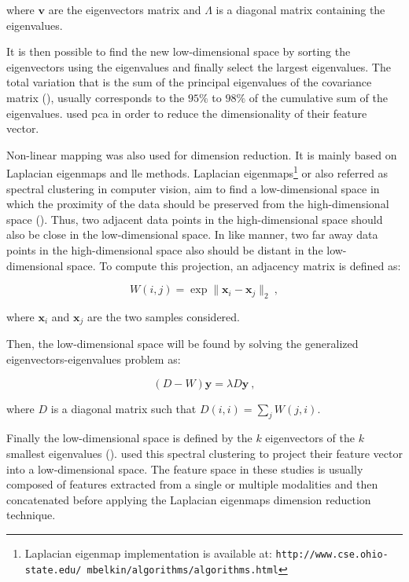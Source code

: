\noindent where $\mathbf{v}$ are the eigenvectors matrix and $\Lambda$ is a diagonal matrix containing the eigenvalues. 

It is then possible to find the new low-dimensional space by sorting the eigenvectors using the eigenvalues and finally select the largest eigenvalues. The total variation that is the sum of the principal eigenvalues of the covariance matrix (\cite{Fodor2002}), usually corresponds to the $95\%$ to $98\%$ of the cumulative sum of the eigenvalues. \cite{Tiwari2008,Tiwari2009,Tiwari2012} used \ac{pca} in order to reduce the dimensionality of their feature vector.

Non-linear mapping was also used for dimension reduction. It is mainly based on Laplacian eigenmaps and \acf{lle} methods. Laplacian eigenmaps\footnote{Laplacian eigenmap implementation is available at: \texttt{http://www.cse.\allowbreak ohio-state.edu/~mbelkin/algorithms/algorithms.html}} or also referred as spectral clustering in computer vision, aim to find a low-dimensional space in which the proximity of the data should be preserved from the high-dimensional space (\cite{Shi2000,Belkin2001}). Thus, two adjacent data points in the high-dimensional space should also be close in the low-dimensional space. In like manner, two far away data points in the high-dimensional space also should be distant in the low-dimensional space. To compute this projection, an adjacency matrix is defined as:

\begin{equation}
	W(i,j) = \exp \| \mathbf{x}_i - \mathbf{x}_j \|_2 \ ,
	\label{eq:gew}
\end{equation}

\noindent where $\mathbf{x}_i$ and $\mathbf{x}_j$ are the two samples considered.

Then, the low-dimensional space will be found by solving the generalized eigenvectors-eigenvalues problem as:

\begin{equation}
	(D-W)\mathbf{y} = \lambda D \mathbf{y} \ ,
	\label{eq:geeig}
\end{equation}

\noindent where $D$ is a diagonal matrix such that $D(i,i) = \sum_j W(j,i)$.

Finally the low-dimensional space is defined by the $k$ eigenvectors of the $k$ smallest eigenvalues (\cite{Belkin2001}). \cite{Tiwari2007,Tiwari2009,Tiwari2009a,Viswanath2008} used this spectral clustering to project their feature vector into a low-dimensional space. The feature space in these studies is usually composed of features extracted from a single or multiple modalities and then concatenated before applying the Laplacian eigenmaps dimension reduction technique.

